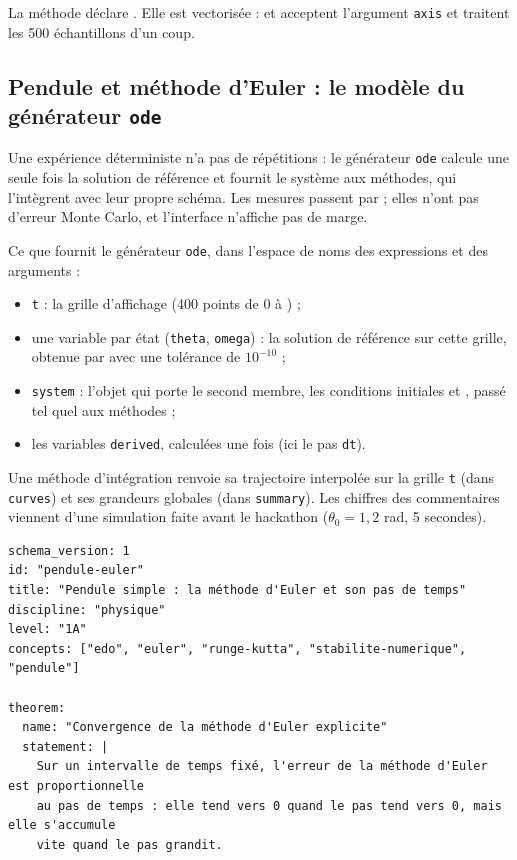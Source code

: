 \documentclass[11pt,a4paper]{article}
\begin{document}
\begin{appendices}
La méthode  déclare . Elle est vectorisée :  et  acceptent l'argument \texttt{axis} et traitent les 500 échantillons d'un coup.

\subsection{Pendule et méthode d'Euler : le modèle du générateur \texttt{ode}}\label{ann:yaml-ode}
Une expérience déterministe n'a pas de répétitions : le générateur \texttt{ode} calcule une seule fois la solution de référence et fournit le système aux méthodes, qui l'intègrent avec leur propre schéma. Les mesures passent par  ; elles n'ont pas d'erreur Monte Carlo, et l'interface n'affiche pas de marge.

Ce que fournit le générateur \texttt{ode}, dans l'espace de noms des expressions et des arguments :
\begin{itemize}[leftmargin=*, nosep]
  \item \texttt{t} : la grille d'affichage (400 points de 0 à ) ;
  \item une variable par état (\texttt{theta}, \texttt{omega}) : la solution de référence sur cette grille, obtenue par  avec une tolérance de $10^{-10}$ ;
  \item \texttt{system} : l'objet qui porte le second membre, les conditions initiales et , passé tel quel aux méthodes ;
  \item les variables \texttt{derived}, calculées une fois (ici le pas \texttt{dt}).
\end{itemize}
Une méthode d'intégration renvoie sa trajectoire interpolée sur la grille \texttt{t} (dans \texttt{curves}) et ses grandeurs globales (dans \texttt{summary}). Les chiffres des commentaires viennent d'une simulation faite avant le hackathon ($\theta_0 = 1{,}2$ rad, 5 secondes).

\begin{lstlisting}[caption={Fichier de référence \texttt{experiments/pendule\_euler.yaml}.}]
schema_version: 1
id: "pendule-euler"
title: "Pendule simple : la méthode d'Euler et son pas de temps"
discipline: "physique"
level: "1A"
concepts: ["edo", "euler", "runge-kutta", "stabilite-numerique", "pendule"]

theorem:
  name: "Convergence de la méthode d'Euler explicite"
  statement: |
    Sur un intervalle de temps fixé, l'erreur de la méthode d'Euler est proportionnelle
    au pas de temps : elle tend vers 0 quand le pas tend vers 0, mais elle s'accumule
    vite quand le pas grandit.


\end{lstlisting}
\end{appendices}
\end{document}

